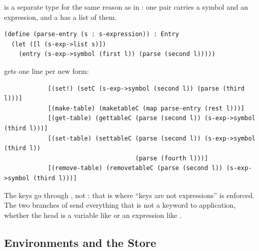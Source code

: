  is a separate type for the same reason as  in : one  pair carries a symbol and an expression, and a  has a list of them.
\begin{lstlisting}
(define (parse-entry (s : s-expression)) : Entry
  (let ([l (s-exp->list s)])
    (entry (s-exp->symbol (first l)) (parse (second l)))))
\end{lstlisting}
 gets one line per new form:
\begin{lstlisting}
            [(set!) (setC (s-exp->symbol (second l)) (parse (third l)))]
            [(make-table) (maketableC (map parse-entry (rest l)))]
            [(get-table) (gettableC (parse (second l)) (s-exp->symbol (third l)))]
            [(set-table) (settableC (parse (second l)) (s-exp->symbol (third l))
                                    (parse (fourth l)))]
            [(remove-table) (removetableC (parse (second l)) (s-exp->symbol (third l)))]
\end{lstlisting}
The keys go through , not : that is where ``keys are not expressions'' is enforced. The two  branches of  send everything that is not a keyword to application, whether the head is a variable like  or an expression like .

\subsection{Environments and the Store}

